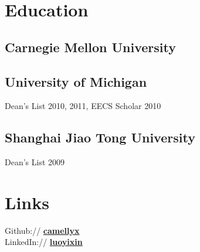 \documentclass[]{resume}
\begin{document}
%
%
\lastupdated%

%
%

%
%

\begin{minipage}[t]{0.377\textwidth}


\section{Education}

\subsection{Carnegie Mellon University}
\sectionsep%

\subsection{University of Michigan}
Dean's List 2010, 2011, EECS Scholar 2010 \\
\sectionsep%

\subsection{Shanghai Jiao Tong University}
Dean's List 2009 \\



\section{Links}
Github:// \href{https://github.com/camellyx}{\bf camellyx} \\
LinkedIn:// \href{https://www.linkedin.com/in/luoyixin}{\bf luoyixin} \\


\end{minipage}
\end{document}
